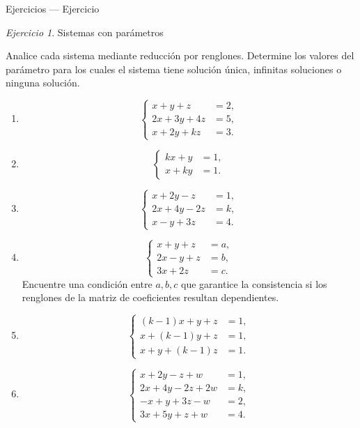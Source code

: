 \documentclass[aspectratio=169,11pt]{beamer}
\theoremstyle{remark}
\newtheorem{Ejer}[definicion]{Ejercicio}
\newcommand{\sistema}[1]{\[\left\{\begin{aligned}#1\end{aligned}\right.\]}
\begin{document}
\begin{frame}[shrink=5]{Ejercicios — Ejercicio}
\footnotesize
\begin{Ejer} Sistemas con parámetros

Analice cada sistema mediante reducción por renglones. Determine los valores del parámetro
para los cuales el sistema tiene solución única, infinitas soluciones o ninguna solución.

\begin{enumerate}[resume]

\item
\sistema{
x+y+z&=2,\\
2x+3y+4z&=5,\\
x+2y+kz&=3.
}

\item
\sistema{
kx+y&=1,\\
x+ky&=1.
}

\item
\sistema{
x+2y-z&=1,\\
2x+4y-2z&=k,\\
x-y+3z&=4.
}

\item 
\sistema{
x+y+z&=a,\\
2x-y+z&=b,\\
3x+2z&=c.
}
Encuentre una condición entre $a,b,c$ que garantice la consistencia si los renglones
de la matriz de coeficientes resultan dependientes.

\item
\sistema{
(k-1)x+y+z&=1,\\
x+(k-1)y+z&=1,\\
x+y+(k-1)z&=1.
}

\item 
\sistema{
x+2y-z+w&=1,\\
2x+4y-2z+2w&=k,\\
-x+y+3z-w&=2,\\
3x+5y+z+w&=4.
}

\end{enumerate}
\end{Ejer}
\end{frame}
\end{document}
